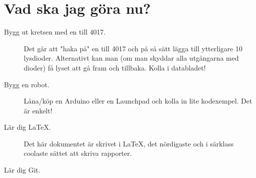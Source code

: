 \documentclass{article}
\begin{document}
\section{Vad ska jag göra nu?}
\begin{description}
\item[Bygg ut kretsen med en till 4017.] Det går att "haka på" en till 4017 och på så sätt lägga till ytterligare 10 lysdioder. Alternativt kan man (om man skyddar alla utgångarna med dioder) få lyset att gå fram och tillbaka. Kolla i databladet!
\item[Bygg en robot.] Låna/köp en Arduino eller en Launchpad och kolla in lite kodexempel. Det är enkelt!
\item[Lär dig \LaTeX.] Det här dokumentet är skrivet i \LaTeX, det nördigaste och i särklass coolaste sättet att skriva rapporter.
\item[Lär dig Git.]  
\end{description}
\end{document}
